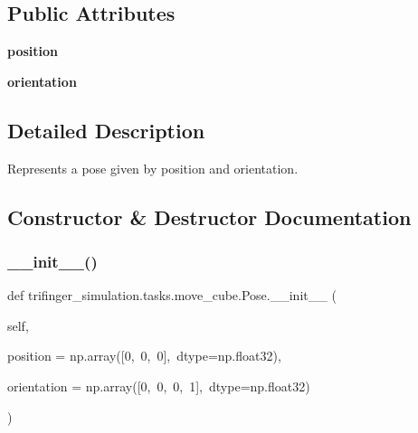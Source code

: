 \subsection*{Public Attributes}
\begin{DoxyCompactItemize}
\item 
\mbox{\label{classtrifinger__simulation_1_1tasks_1_1move__cube_1_1Pose_aab00b859b957a541d5140e3154c1bda7}} 
{\bfseries position}
\item 
\mbox{\label{classtrifinger__simulation_1_1tasks_1_1move__cube_1_1Pose_a173fc702da0fbf3eaa4d37d89520914a}} 
{\bfseries orientation}
\end{DoxyCompactItemize}


\subsection{Detailed Description}
Represents a pose given by position and orientation. 



\subsection{Constructor \& Destructor Documentation}
\mbox{\label{classtrifinger__simulation_1_1tasks_1_1move__cube_1_1Pose_a96a9d2e3937aa6eb7b1c6b9ac1b56eeb}} 
\subsubsection{\texorpdfstring{\+\_\+\+\_\+init\+\_\+\+\_\+()}{\_\_init\_\_()}}
{\footnotesize\ttfamily def trifinger\+\_\+simulation.\+tasks.\+move\+\_\+cube.\+Pose.\+\_\+\+\_\+init\+\_\+\+\_\+ (\begin{DoxyParamCaption}\item[{}]{self,  }\item[{}]{position = {\ttfamily np.array(\mbox{[}0,~0,~0\mbox{]},~dtype=np.float32)},  }\item[{}]{orientation = {\ttfamily np.array(\mbox{[}0,~0,~0,~1\mbox{]},~dtype=np.float32)} }\end{DoxyParamCaption})}



